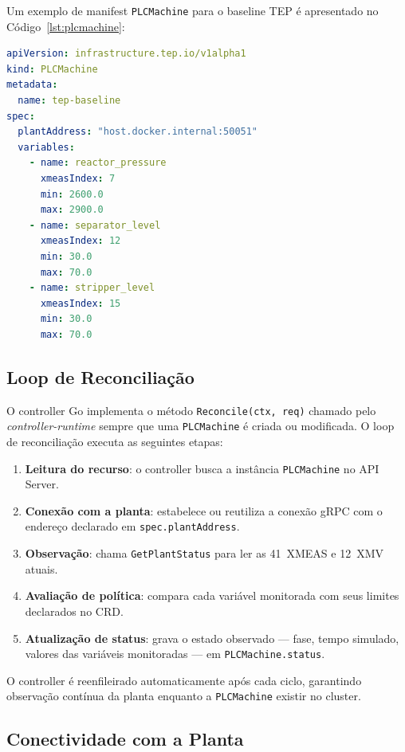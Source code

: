Um exemplo de manifest \texttt{PLCMachine} para o baseline TEP é apresentado no Código~\ref{lst:plcmachine}:

\begin{lstlisting}[language=yaml, caption={Manifest PLCMachine para o baseline TEP}, label={lst:plcmachine}]
apiVersion: infrastructure.tep.io/v1alpha1
kind: PLCMachine
metadata:
  name: tep-baseline
spec:
  plantAddress: "host.docker.internal:50051"
  variables:
    - name: reactor_pressure
      xmeasIndex: 7
      min: 2600.0
      max: 2900.0
    - name: separator_level
      xmeasIndex: 12
      min: 30.0
      max: 70.0
    - name: stripper_level
      xmeasIndex: 15
      min: 30.0
      max: 70.0
\end{lstlisting}

\subsection{Loop de Reconciliação}

O controller Go implementa o método \texttt{Reconcile(ctx, req)} chamado pelo \textit{controller-runtime} sempre que uma \texttt{PLCMachine} é criada ou modificada. O loop de reconciliação executa as seguintes etapas:

\begin{enumerate}
  \item \textbf{Leitura do recurso}: o controller busca a instância \texttt{PLCMachine} no API Server.
  \item \textbf{Conexão com a planta}: estabelece ou reutiliza a conexão gRPC com o endereço declarado em \texttt{spec.plantAddress}.
  \item \textbf{Observação}: chama \texttt{GetPlantStatus} para ler as 41~XMEAS e 12~XMV atuais.
  \item \textbf{Avaliação de política}: compara cada variável monitorada com seus limites declarados no CRD.
  \item \textbf{Atualização de status}: grava o estado observado — fase, tempo simulado, valores das variáveis monitoradas — em \texttt{PLCMachine.status}.
\end{enumerate}

O controller é reenfileirado automaticamente após cada ciclo, garantindo observação contínua da planta enquanto a \texttt{PLCMachine} existir no cluster.

\subsection{Conectividade com a Planta}


